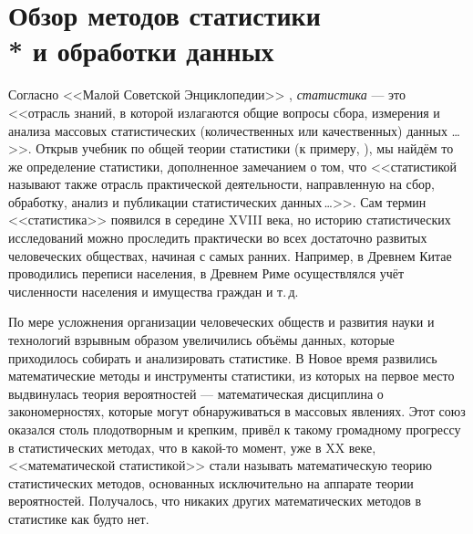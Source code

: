 \documentclass[a5paper,openany]{book}
\begin{document}
  
  
\chapter[Обзор методов статистики и обработки данных]%
        {Обзор методов статистики\\* и обработки данных} 
  
  
Согласно <<Малой Советской Энциклопедии>> \cite{MalSovEncycl},  \emph{статистика} 
--- это <<отрасль знаний, в которой излагаются общие вопросы сбора, измерения и 
анализа массовых статистических (количественных или качественных) данных \ldots>>. 
Открыв учебник по общей теории статистики (к примеру, \cite{EliseevaYuzbashev}), 
мы найдём то же определение статистики, дополненное замечанием о том, что <<статистикой 
называют также отрасль практической деятельности, направленную на сбор, обработку, 
анализ и публикации статистических данных\,\ldots>>. Сам термин 
<<статистика>> появился в середине XVIII века, но историю статистических исследований 
можно проследить практически во всех достаточно развитых человеческих обществах, начиная 
с самых ранних. Например, в Древнем Китае проводились переписи населения, в Древнем Риме 
осуществлялся учёт численности населения и имущества граждан и т.\,д. 
  
По мере усложнения организации человеческих обществ и развития науки и технологий 
взрывным образом увеличились объёмы данных, которые приходилось собирать и анализировать 
статистике. В Новое время развились математические методы и инструменты статистики, 
из которых на первое место выдвинулась теория вероятностей --- математическая дисциплина 
о закономерностях, которые могут обнаруживаться в массовых явлениях. Этот союз оказался 
столь плодотворным и крепким, привёл к такому громадному прогрессу в статистических 
методах, что в какой-то момент, уже в XX веке, <<математической статистикой>> стали 
называть математическую теорию статистических методов, основанных исключительно 
на аппарате теории вероятностей. Получалось, что никаких других математических 
методов в статистике как будто нет. 
  
\end{document}
